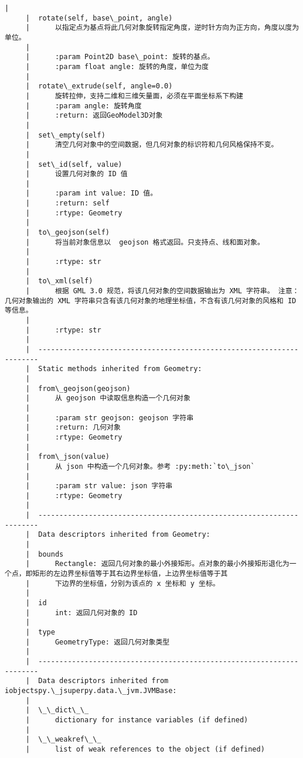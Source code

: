 \documentclass[11pt]{article}
\begin{document}
\begin{Verbatim}[commandchars=\\\{\}]
     |  
     |  rotate(self, base\_point, angle)
     |      以指定点为基点将此几何对象旋转指定角度，逆时针方向为正方向，角度以度为单位。
     |      
     |      :param Point2D base\_point: 旋转的基点。
     |      :param float angle: 旋转的角度，单位为度
     |  
     |  rotate\_extrude(self, angle=0.0)
     |      旋转拉伸，支持二维和三维矢量面，必须在平面坐标系下构建
     |      :param angle: 旋转角度
     |      :return: 返回GeoModel3D对象
     |  
     |  set\_empty(self)
     |      清空几何对象中的空间数据，但几何对象的标识符和几何风格保持不变。
     |  
     |  set\_id(self, value)
     |      设置几何对象的 ID 值
     |      
     |      :param int value: ID 值。
     |      :return: self
     |      :rtype: Geometry
     |  
     |  to\_geojson(self)
     |      将当前对象信息以  geojson 格式返回。只支持点、线和面对象。
     |      
     |      :rtype: str
     |  
     |  to\_xml(self)
     |      根据 GML 3.0 规范，将该几何对象的空间数据输出为 XML 字符串。 注意：几何对象输出的 XML 字符串只含有该几何对象的地理坐标值，不含有该几何对象的风格和 ID 等信息。
     |      
     |      :rtype: str
     |  
     |  ----------------------------------------------------------------------
     |  Static methods inherited from Geometry:
     |  
     |  from\_geojson(geojson)
     |      从 geojson 中读取信息构造一个几何对象
     |      
     |      :param str geojson: geojson 字符串
     |      :return: 几何对象
     |      :rtype: Geometry
     |  
     |  from\_json(value)
     |      从 json 中构造一个几何对象。参考 :py:meth:`to\_json`
     |      
     |      :param str value: json 字符串
     |      :rtype: Geometry
     |  
     |  ----------------------------------------------------------------------
     |  Data descriptors inherited from Geometry:
     |  
     |  bounds
     |      Rectangle: 返回几何对象的最小外接矩形。点对象的最小外接矩形退化为一个点，即矩形的左边界坐标值等于其右边界坐标值，上边界坐标值等于其
     |      下边界的坐标值，分别为该点的 x 坐标和 y 坐标。
     |  
     |  id
     |      int: 返回几何对象的 ID
     |  
     |  type
     |      GeometryType: 返回几何对象类型
     |  
     |  ----------------------------------------------------------------------
     |  Data descriptors inherited from iobjectspy.\_jsuperpy.data.\_jvm.JVMBase:
     |  
     |  \_\_dict\_\_
     |      dictionary for instance variables (if defined)
     |  
     |  \_\_weakref\_\_
     |      list of weak references to the object (if defined)
    

\end{Verbatim}
\end{document}
